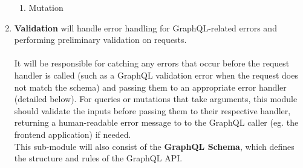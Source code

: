\documentclass[../../main.tex]{subfiles}
\begin{document}
\begin{enumerate}
\begin{enumerate}
              \item Mutation\\
          \end{enumerate}

    \item \textbf{Validation} will handle error handling for GraphQL-related errors
          and performing preliminary validation on requests.\\\\
          It will be responsible for catching any errors that occur before the
          request handler is called (such as a GraphQL validation error when the
          request does not match the schema) and passing them to an appropriate
          error handler (detailed below). For queries or mutations that take arguments,
          this module should validate the inputs before passing them
          to their respective handler, returning a human-readable error
          message to to the GraphQL caller (eg. the frontend application) if needed.\\
          This sub-module will also consist of the \textbf{GraphQL Schema}, which defines
          the structure and rules of the GraphQL API.
\end{enumerate}
\end{document}
